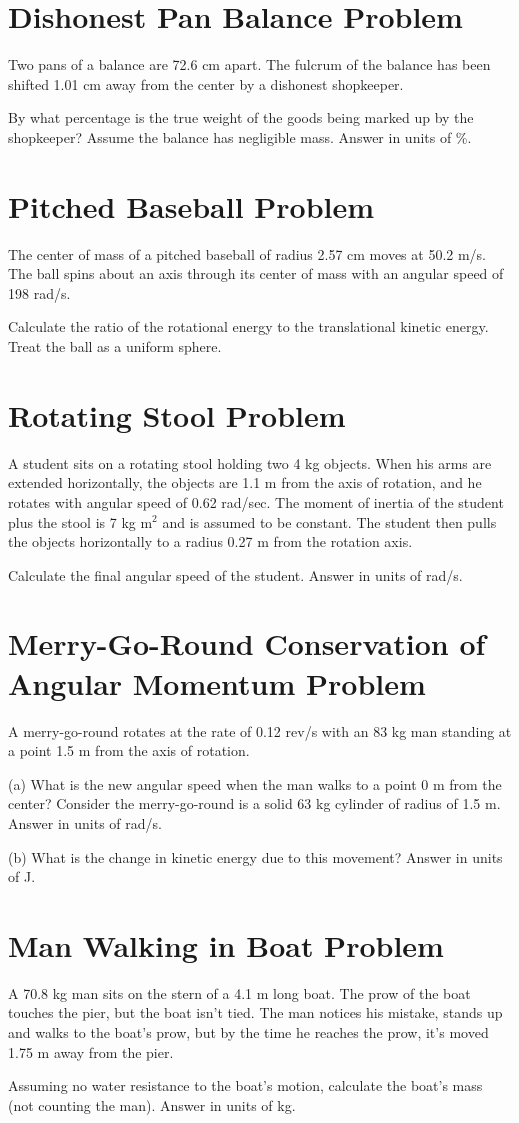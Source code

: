 \documentclass[../physics12.tex]{subfiles}
\begin{document}
\section{Dishonest Pan Balance Problem}
Two pans of a balance are 72.6 cm apart. The fulcrum of the balance has been shifted 1.01 cm away from the center by a dishonest shopkeeper.

By what percentage is the true weight of the goods being marked up by the shopkeeper? Assume the balance has negligible mass.
Answer in units of \%.

\section{Pitched Baseball Problem}
The center of mass of a pitched baseball of radius 2.57 cm moves at 50.2 m/s. The ball spins about an axis through its center of mass with an angular speed of 198 rad/s.

Calculate the ratio of the rotational energy to the translational kinetic energy. Treat the ball as a uniform sphere.

\section{Rotating Stool Problem}
A student sits on a rotating stool holding two 4 kg objects. When his arms are extended horizontally, the objects are 1.1 m from the axis of rotation, and he rotates with angular speed of 0.62 rad/sec.
The moment of inertia of the student plus the stool is 7 kg m$^2$ and is assumed to be constant. The student then pulls the objects horizontally to a radius 0.27 m from the rotation axis.

Calculate the final angular speed of the student.
Answer in units of rad/s.

\section{Merry-Go-Round Conservation of Angular Momentum Problem}
A merry-go-round rotates at the rate of 0.12 rev/s with an 83 kg man standing at a point 1.5 m from the axis of rotation.

(a) What is the new angular speed when the man walks to a point 0 m from the center? Consider the merry-go-round is a solid 63 kg cylinder of radius of 1.5 m.
Answer in units of rad/s.

(b) What is the change in kinetic energy due to this movement?
Answer in units of J.

\section{Man Walking in Boat Problem}
A 70.8 kg man sits on the stern of a 4.1 m long boat. The prow of the boat touches the pier, but the boat isn't tied.
The man notices his mistake, stands up and walks to the boat's prow, but by the time he reaches the prow, it's moved 1.75 m away from the pier.

Assuming no water resistance to the boat's motion, calculate the boat's mass (not counting the man). Answer in units of kg.
\end{document}
